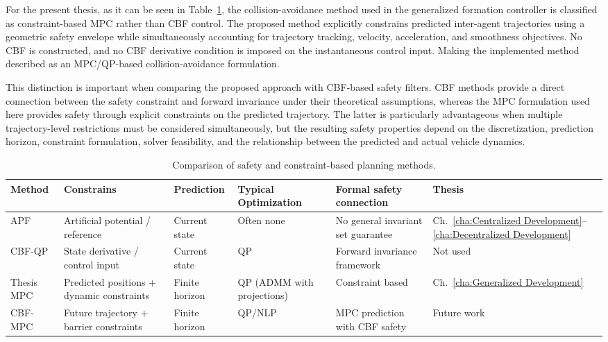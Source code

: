 For the present thesis, as it can be seen in Table~\ref{tab.2:collision_method_comparison}, the collision-avoidance method used in the generalized formation controller is classified as constraint-based \gls{MPC} rather than \gls{CBF} control. The proposed method explicitly constrains predicted inter-agent trajectories using a geometric safety envelope while simultaneously accounting for trajectory tracking, velocity, acceleration, and smoothness objectives. No \gls{CBF} is constructed, and no \gls{CBF} derivative condition is imposed on the instantaneous control input. Making the implemented method described as an \gls{MPC}/\gls{QP}-based collision-avoidance formulation.

This distinction is important when comparing the proposed approach with \gls{CBF}-based safety filters. \gls{CBF} methods provide a direct connection between the safety constraint and forward invariance under their theoretical assumptions, whereas the \gls{MPC} formulation used here provides safety through explicit constraints on the predicted trajectory. The latter is particularly advantageous when multiple trajectory-level restrictions must be considered simultaneously, but the resulting safety properties depend on the discretization, prediction horizon, constraint formulation, solver feasibility, and the relationship between the predicted and actual vehicle dynamics.


\begin{table}[htbp]
\centering
\caption{Comparison of safety and constraint-based planning methods.}
\label{tab.2:collision_method_comparison}
\small
\setlength{\tabcolsep}{4pt}
\begin{tabularx}{\textwidth}{@{}l X X X X l@{}}
\hline
\textbf{Method} &
\textbf{Constrains} &
\textbf{Prediction} &
\textbf{Typical Optimization} &
\textbf{Formal safety connection} &
\textbf{Thesis} \\
\hline

APF &
Artificial potential / reference &
Current state &
Often none &
No general invariant set guarantee &
Ch.~\ref{cha:Centralized Development}--\ref{cha:Decentralized Development} \\

CBF-QP &
State derivative / control input &
Current state &
QP &
Forward invariance framework &
Not used \\

Thesis MPC &
Predicted positions + dynamic constraints &
Finite horizon &
QP (ADMM with projections) &
Constraint based&
Ch.~\ref{cha:Generalized Development} \\

CBF-MPC &
Future trajectory + barrier constraints &
Finite horizon &
QP/NLP &
MPC prediction with CBF safety &
Future work \\

\hline
\end{tabularx}
\end{table}

